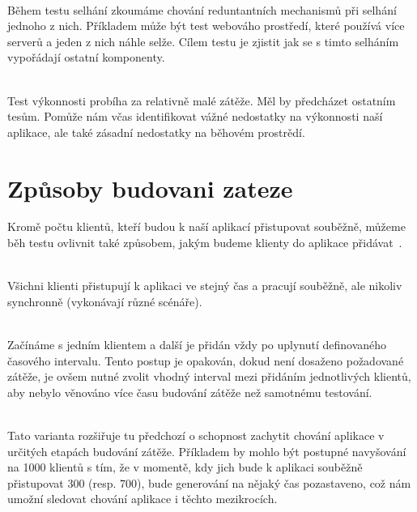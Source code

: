 \documentclass[122pt,oneside]{fithesis}
\begin{document}
\vspace{5 mm}
\\\indent Během testu selhání zkoumáme chování reduntantních mechanismů při selhání jednoho z nich. Příkladem může být test webováho prostředí, které používá více serverů a jeden z nich náhle selže. Cílem testu je zjistit jak se s timto selháním vypořádají ostatní komponenty.
 
\vspace{5 mm}
\\\indent Test výkonnosti probíha za relativně malé zátěže. Měl by předcházet ostatním tesům. Pomůže nám včas identifikovat vážné nedostatky na výkonnosti naší aplikace, ale také zásadní nedostatky na běhovém prostrědí.

\section{Způsoby budovani zateze}

Kromě počtu klientů, kteří budou k naší aplikací přistupovat souběžně, můžeme běh testu ovlivnit také způsobem, jakým budeme klienty do aplikace přidávat~\cite{molyneaux09}.

\vspace{5 mm}
\\\indent Všichni klienti přistupují k aplikaci ve stejný čas a pracují souběžně, ale nikoliv synchronně (vykonávají různé scénáře).

\vspace{5 mm}
\\\indent Začínáme s jedním klientem a další je přidán vždy po uplynutí definovaného časového intervalu. Tento postup je opakován, dokud není dosaženo požadované zátěže, je ovšem nutné zvolit vhodný interval mezi přidáním jednotlivých klientů, aby nebylo věnováno více času budování zátěže než samotnému testování.

\vspace{5 mm}
\\\indent Tato varianta rozšiřuje tu předchozí o schopnost zachytit chování aplikace v určitých etapách budování zátěže. Příkladem by mohlo být postupné navyšování na 1000 klientů s tím, že v momentě, kdy jich bude k aplikaci souběžně přistupovat 300 (resp. 700), bude generování na nějaký čas pozastaveno, což nám umožní sledovat chování aplikace i těchto mezikrocích.
\end{document}
